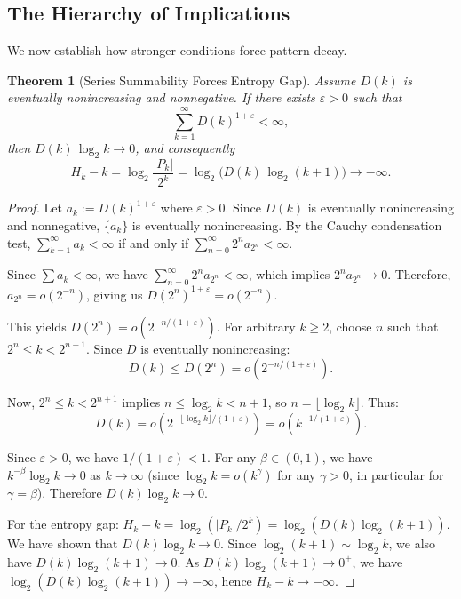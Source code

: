 \documentclass[11pt]{article}
\newtheorem{theorem}{Theorem}
\theoremstyle{definition}
\newcommand{\eps}{\varepsilon}
\begin{document}
\subsection{The Hierarchy of Implications}

We now establish how stronger conditions force pattern decay.

\begin{theorem}[Series Summability Forces Entropy Gap]\label{thm:series-to-entropy}
Assume $D(k)$ is eventually nonincreasing and nonnegative. If there exists $\eps>0$ such that
\begin{equation}
\sum_{k=1}^{\infty} D(k)^{1+\eps} < \infty,
\end{equation}
then $D(k)\,\log_2 k\to 0$, and consequently
\begin{equation}
H_k-k=\log_2\frac{|P_k|}{2^k}=\log_2\big(D(k)\,\log_2(k+1)\big)\longrightarrow -\infty.
\end{equation}
\end{theorem}

\begin{proof}
Let $a_k:=D(k)^{1+\eps}$ where $\eps > 0$. Since $D(k)$ is eventually nonincreasing and nonnegative, $\{a_k\}$ is eventually nonincreasing. By the Cauchy condensation test, $\sum_{k=1}^\infty a_k < \infty$ if and only if $\sum_{n=0}^\infty 2^n a_{2^n} < \infty$.

Since $\sum a_k < \infty$, we have $\sum_{n=0}^\infty 2^n a_{2^n} < \infty$, which implies $2^n a_{2^n} \to 0$. Therefore, $a_{2^n} = o(2^{-n})$, giving us $D(2^n)^{1+\eps} = o(2^{-n})$.

This yields $D(2^n) = o(2^{-n/(1+\eps)})$. For arbitrary $k \geq 2$, choose $n$ such that $2^n \leq k < 2^{n+1}$. Since $D$ is eventually nonincreasing:
$$D(k) \leq D(2^n) = o(2^{-n/(1+\eps)}).$$

Now, $2^n \leq k < 2^{n+1}$ implies $n \leq \log_2 k < n+1$, so $n = \lfloor \log_2 k \rfloor$. Thus:
$$D(k) = o\left(2^{-\lfloor \log_2 k \rfloor/(1+\eps)}\right) = o\left(k^{-1/(1+\eps)}\right).$$

Since $\eps > 0$, we have $1/(1+\eps) < 1$. For any $\beta \in (0,1)$, we have $k^{-\beta} \log_2 k \to 0$ as $k \to \infty$ (since $\log_2 k = o(k^\gamma)$ for any $\gamma > 0$, in particular for $\gamma = \beta$). Therefore $D(k)\log_2 k \to 0$.

For the entropy gap: $H_k - k = \log_2(|P_k|/2^k) = \log_2(D(k)\log_2(k+1))$. We have shown that $D(k)\log_2 k \to 0$. Since $\log_2(k+1) \sim \log_2 k$, we also have $D(k)\log_2(k+1) \to 0$. As $D(k)\log_2(k+1) \to 0^+$, we have $\log_2(D(k)\log_2(k+1)) \to -\infty$, hence $H_k - k \to -\infty$.
\end{proof}
\end{document}
